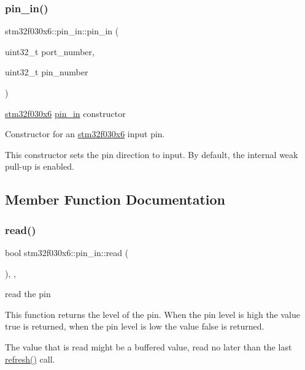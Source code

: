 \subsubsection{\texorpdfstring{pin\+\_\+in()}{pin\_in()}}
{\footnotesize\ttfamily stm32f030x6\+::pin\+\_\+in\+::pin\+\_\+in (\begin{DoxyParamCaption}\item[{uint32\+\_\+t}]{port\+\_\+number,  }\item[{uint32\+\_\+t}]{pin\+\_\+number }\end{DoxyParamCaption})\hspace{0.3cm}{\ttfamily [inline]}}

\hyperlink{namespacestm32f030x6}{stm32f030x6} \hyperlink{classstm32f030x6_1_1pin__in}{pin\+\_\+in} constructor

Constructor for an \hyperlink{namespacestm32f030x6}{stm32f030x6} input pin.

This constructor sets the pin direction to input. By default, the internal weak pull-\/up is enabled. 

\subsection{Member Function Documentation}
\mbox{\label{classstm32f030x6_1_1pin__in_a930e692fe61caf9724c53ac9f0577432}} 
\subsubsection{\texorpdfstring{read()}{read()}}
{\footnotesize\ttfamily bool stm32f030x6\+::pin\+\_\+in\+::read (\begin{DoxyParamCaption}{ }\end{DoxyParamCaption})\hspace{0.3cm}{\ttfamily [inline]}, {\ttfamily [override]}, {\ttfamily [virtual]}}





read the pin

This function returns the level of the pin. When the pin level is high the value true is returned, when the pin level is low the value false is returned.

The value that is read might be a buffered value, read no later than the last \hyperlink{classstm32f030x6_1_1pin__in_a8d213fc447b0c7e8acf5f331f1c85683}{refresh()} call. 

